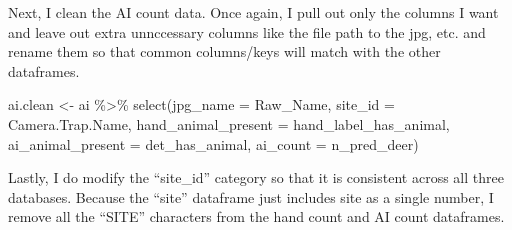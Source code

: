 \documentclass[
]{book}
\newenvironment{Shaded}{\begin{snugshade}}{\end{snugshade}}
\newcommand{\AttributeTok}[1]{\textcolor[rgb]{0.77,0.63,0.00}{#1}}
\newcommand{\ConstantTok}[1]{\textcolor[rgb]{0.00,0.00,0.00}{#1}}
\newcommand{\FunctionTok}[1]{\textcolor[rgb]{0.00,0.00,0.00}{#1}}
\newcommand{\NormalTok}[1]{#1}
\newcommand{\OtherTok}[1]{\textcolor[rgb]{0.56,0.35,0.01}{#1}}
\newcommand{\SpecialCharTok}[1]{\textcolor[rgb]{0.00,0.00,0.00}{#1}}
\newcommand{\StringTok}[1]{\textcolor[rgb]{0.31,0.60,0.02}{#1}}
\begin{document}
Next, I clean the AI count data. Once again, I pull out only the columns I want and leave out extra unnccessary columns like the file path to the jpg, etc. and rename them so that common columns/keys will match with the other dataframes.

\begin{Shaded}
\begin{Highlighting}[]
\NormalTok{ai.clean }\OtherTok{\textless{}{-}}\NormalTok{ ai }\SpecialCharTok{\%\textgreater{}\%} 
  \FunctionTok{select}\NormalTok{(}\AttributeTok{jpg\_name =}\NormalTok{ Raw\_Name,}
         \AttributeTok{site\_id =}\NormalTok{ Camera.Trap.Name,}
         \AttributeTok{hand\_animal\_present =}\NormalTok{ hand\_label\_has\_animal,}
         \AttributeTok{ai\_animal\_present =}\NormalTok{ det\_has\_animal,}
         \AttributeTok{ai\_count =}\NormalTok{ n\_pred\_deer)}
\end{Highlighting}
\end{Shaded}

Lastly, I do modify the ``site\_id'' category so that it is consistent across all three databases. Because the ``site'' dataframe just includes site as a single number, I remove all the ``SITE'' characters from the hand count and AI count dataframes.

\begin{Shaded}
\end{Shaded}
\end{document}
